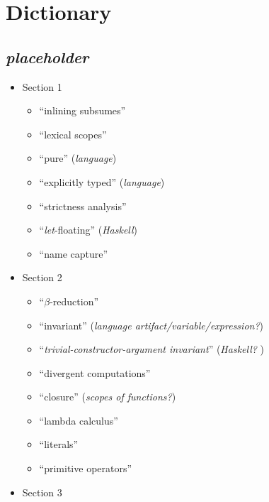 
\section{Dictionary}


\subsection{\textit{placeholder}}

\begin{itemize}

	\item Section 1
\begin{itemize}

	\item ``inlining subsumes''
	\item ``lexical scopes''
	\item ``pure'' (\textit{language})
	\item ``explicitly typed'' (\textit{language})
	\item ``strictness analysis''
	\item ``\textit{let}-floating'' (\textit{Haskell})
	\item ``name capture''

\end{itemize}

	\item Section 2
\begin{itemize}

	\item ``\textit{$\beta$}-reduction''
	\item ``invariant'' (\textit{language artifact/variable/expression?})
	\item ``\textit{trivial-constructor-argument invariant}'' (\textit{Haskell?
})
	\item ``divergent computations''
	\item ``closure'' (\textit{scopes of functions?})
	\item ``lambda calculus''
	\item ``literals''
	\item ``primitive operators''

\end{itemize}

	\item Section 3
\begin{itemize}


\end{itemize}
\end{itemize}
